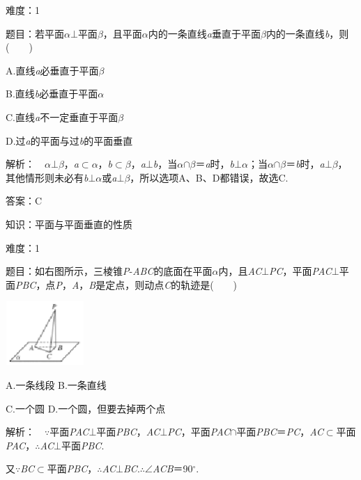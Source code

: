 \documentclass{article} %
\begin{document}
难度：1

题目：若平面\textit{$\alpha$}$\mathrm{\bot}$平面\textit{$\beta$}，且平面\textit{$\alpha$}内的一条直线\textit{a}垂直于平面\textit{$\beta$}内的一条直线\textit{b}，则(　　)

A.直线\textit{a}必垂直于平面\textit{$\beta$}

B.直线\textit{b}必垂直于平面\textit{$\alpha$}

C.直线\textit{a}不一定垂直于平面\textit{$\beta$}

D.过\textit{a}的平面与过\textit{b}的平面垂直

解析：　\textit{$\alpha$}$\mathrm{\bot}$\textit{$\beta$}，\textit{a}$\mathrm{\subset }$\textit{$\alpha$}，\textit{b}$\mathrm{\subset }$\textit{$\beta$}，\textit{a}$\mathrm{\bot}$\textit{b}，当\textit{$\alpha$}$\mathrm{\cap}$\textit{$\beta$}＝\textit{a}时，\textit{b}$\mathrm{\bot}$\textit{$\alpha$}；当\textit{$\alpha$}$\mathrm{\cap}$\textit{$\beta$}＝\textit{b}时，\textit{a}$\mathrm{\bot}$\textit{$\beta$}，其他情形则未必有\textit{b}$\mathrm{\bot}$\textit{$\alpha$}或\textit{a}$\mathrm{\bot}$\textit{$\beta$}，所以选项A、B、D都错误，故选C.

答案：C

知识：平面与平面垂直的性质

难度：1

题目：如右图所示，三棱锥\textit{P}-\textit{ABC}的底面在平面\textit{$\alpha$}内，且\textit{AC}$\mathrm{\bot}$\textit{PC}，平面\textit{PAC}$\mathrm{\bot}$平面\textit{PBC}，点\textit{P}，\textit{A}，\textit{B}是定点，则动点\textit{C}的轨迹是(　　)

\includegraphics*[width=1.17in, height=0.96in, keepaspectratio=false]{image251}

A.一条线段  B.一条直线 

C.一个圆  D.一个圆，但要去掉两个点

解析：　$\mathrm{\because}$平面\textit{PAC}$\mathrm{\bot}$平面\textit{PBC}，\textit{AC}$\mathrm{\bot}$\textit{PC}，平面\textit{PAC}$\mathrm{\cap}$平面\textit{PBC}＝\textit{PC}，\textit{AC}$\mathrm{\subset }$平面\textit{PAC}，$\mathrm{\therefore}$\textit{AC}$\mathrm{\bot}$平面\textit{PBC}.

又$\mathrm{\because}$\textit{BC}$\mathrm{\subset }$平面\textit{PBC}，$\mathrm{\therefore}$\textit{AC}$\mathrm{\bot}$\textit{BC}.$\mathrm{\therefore}$$\mathrm{\angle}$\textit{ACB}＝90$\mathrm{{}^\circ}$.
\end{document}
